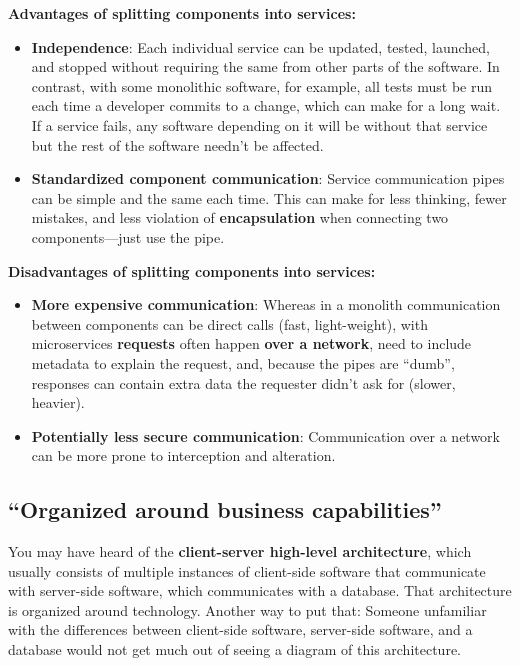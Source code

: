 \spacer
\noindent\textbf{Advantages of splitting components into services:}\\

\begin{itemize}
    \item \textbf{Independence}: Each individual service can be updated, tested, launched, and stopped without requiring the same from other parts of the software. In contrast, with some monolithic software, for example, all tests must be run each time a developer commits to a change, which can make for a long wait. If a service fails, any software depending on it will be without that service but the rest of the software needn't be affected.\\
    \item \textbf{Standardized component communication}: Service communication pipes can be simple and the same each time. This can make for less thinking, fewer mistakes, and less violation of \textbf{encapsulation} when connecting two components---just use the pipe.
\end{itemize}

\spacer
\noindent\textbf{Disadvantages of splitting components into services:}\\

\begin{itemize}
    \item \textbf{More expensive communication}: Whereas in a monolith communication between components can be direct calls (fast, light-weight), with microservices \textbf{requests} often happen \textbf{over a network}, need to include metadata to explain the request, and, because the pipes are ``dumb'', responses can contain extra data the requester didn't ask for (slower, heavier).\\
    \item \textbf{Potentially less secure communication}: Communication over a network can be more prone to interception and alteration.
\end{itemize}

\marginpar{\clientServerArchitectureDef}
\subsection{``Organized around business capabilities''}

You may have heard of the \textbf{client-server high-level architecture}, which usually consists of multiple instances of client-side software that communicate with server-side software, which communicates with a database. That architecture is organized around technology. Another way to put that: Someone unfamiliar with the differences between client-side software, server-side software, and a database would not get much out of seeing a diagram of this architecture. 

